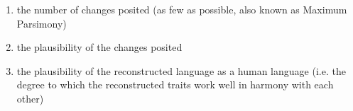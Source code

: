 \documentclass[12pt,letterpaper]{article}
\begin{document}
\begin{enumerate}[label=(\roman*)]
\item the number of changes posited (as few as possible, also known as Maximum Parsimony)
\item the plausibility of the changes posited
\item the plausibility of the reconstructed language as a human language (i.e. the degree to which the reconstructed traits work well in harmony with each other)
\end{enumerate}



\end{document}
